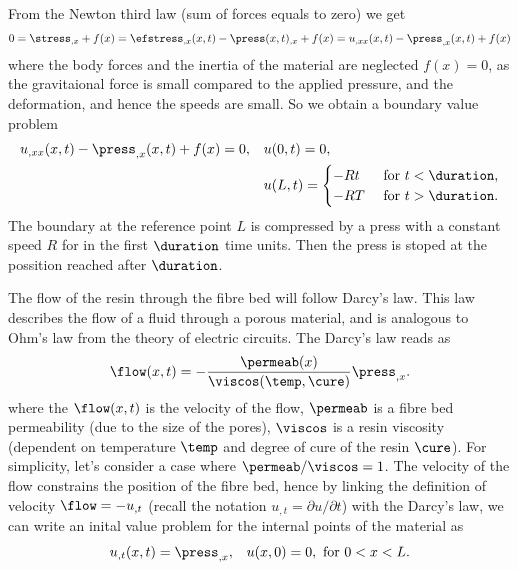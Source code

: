 \documentclass[twoside,a4paper,12pt,draft]{article}
\begin{document}
From the Newton third law (sum of forces equals to zero) we get
%
\begin{align}
  0 =
  \stress_{,x} + f(x) =
  \efstress_{,x}(x,t) - \press(x,t)_{,x} + f(x) =
  u_{,xx}(x,t) - \press_{,x}(x,t) + f(x) 
\end{align}
%
where the body forces and the inertia of the material are neglected
$f(x) = 0$, as the gravitaional force is small compared to the applied
pressure, and the deformation, and hence the speeds are small.
%
So we obtain a boundary value problem
%
\begin{align}
  u_{,xx}(x,t) - \press_{,x}(x,t) + f(x) \label{eq:bvp-flow}
  = 0 , &&& u(0,t) = 0,\\\nonumber
        &&&u(L,t) =
            \begin{cases}
              -Rt &\text{ for } t < \duration,\\
              -RT &\text{ for } t > \duration.
            \end{cases} 
\end{align}
%
The boundary at the reference point $L$ is compressed by a press with
a constant speed $R$ for in the first $\duration$ time units. Then the press
is stoped at the possition reached after $\duration$.

%

The flow of the resin through the fibre bed will follow Darcy's law.
This law describes the flow of a fluid through a porous material, and
is analogous to Ohm's law from the theory of electric circuits. The
Darcy's law reads as
%
\begin{align}
  \flow(x,t) = -\frac{\permeab(x)}{\viscos(\temp,\cure)} \press_{,x}. \label{eq:darcy}
\end{align}
where the $\flow(x,t)$ is the velocity of the flow, $\permeab$ is a fibre bed
permeability (due to the size of the pores),
%
%
$\viscos$ is a resin viscosity (dependent on temperature $\temp$ and
degree of cure of the resin $\cure$).  For simplicity, let's consider
a case where $\permeab/\viscos=1$.
%
The velocity of the flow constrains the position of the fibre bed,
hence by linking the definition of velocity $\flow = - u_{,t}$ (recall the
notation $u_{,t} = \partial u/\partial t$) with the Darcy's law, we
can write an inital value problem for the internal points of the
material as
%
\begin{align}
  u_{,t}(x,t) =  \press_{,x} , && u(x,0) = 0 , \text{ for } 0 < x < L. \label{eq:velocity}
\end{align}
\end{document}
